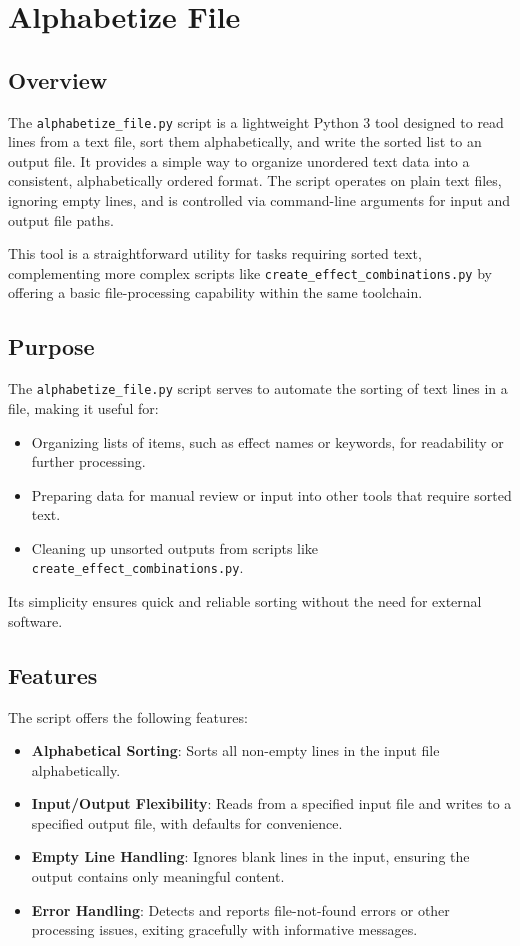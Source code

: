 \section{Alphabetize File}
\subsection{Overview}
The \texttt{alphabetize\_file.py} script is a lightweight Python 3 tool designed to read lines from a text file, sort them alphabetically, and write the sorted list to an output file. It provides a simple way to organize unordered text data into a consistent, alphabetically ordered format. The script operates on plain text files, ignoring empty lines, and is controlled via command-line arguments for input and output file paths.

This tool is a straightforward utility for tasks requiring sorted text, complementing more complex scripts like \texttt{create\_effect\_combinations.py} by offering a basic file-processing capability within the same toolchain.

\subsection{Purpose}
The \texttt{alphabetize\_file.py} script serves to automate the sorting of text lines in a file, making it useful for:
\begin{itemize}
    \item Organizing lists of items, such as effect names or keywords, for readability or further processing.
    \item Preparing data for manual review or input into other tools that require sorted text.
    \item Cleaning up unsorted outputs from scripts like \texttt{create\_effect\_combinations.py}.
\end{itemize}
Its simplicity ensures quick and reliable sorting without the need for external software.

\subsection{Features}
The script offers the following features:
\begin{itemize}
    \item \textbf{Alphabetical Sorting}: Sorts all non-empty lines in the input file alphabetically.
    \item \textbf{Input/Output Flexibility}: Reads from a specified input file and writes to a specified output file, with defaults for convenience.
    \item \textbf{Empty Line Handling}: Ignores blank lines in the input, ensuring the output contains only meaningful content.
    \item \textbf{Error Handling}: Detects and reports file-not-found errors or other processing issues, exiting gracefully with informative messages.
\end{itemize}

